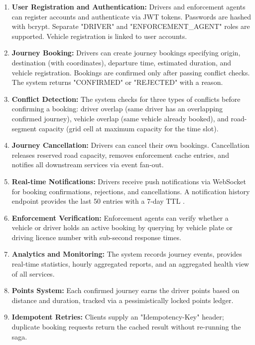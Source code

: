 \documentclass[11pt,a4paper]{article}
\begin{document}
\begin{enumerate}[label=\textbf{FR\arabic*}]
    \item \textbf{User Registration and Authentication:} Drivers and enforcement agents can register accounts and authenticate via JWT tokens. Passwords are hashed with bcrypt. Separate "DRIVER" and "ENFORCEMENT\_AGENT" roles are supported. Vehicle registration is linked to user accounts.
    \item \textbf{Journey Booking:} Drivers can create journey bookings specifying origin, destination (with coordinates), departure time, estimated duration, and vehicle registration. Bookings are confirmed only after passing conflict checks. The system returns "CONFIRMED" or "REJECTED" with a reason.
    \item \textbf{Conflict Detection:} The system checks for three types of conflicts before confirming a booking: driver overlap (same driver has an overlapping confirmed journey), vehicle overlap (same vehicle already booked), and road-segment capacity (grid cell at maximum capacity for the time slot).
    \item \textbf{Journey Cancellation:} Drivers can cancel their own bookings. Cancellation releases reserved road capacity, removes enforcement cache entries, and notifies all downstream services via event fan-out.
    \item \textbf{Real-time Notifications:} Drivers receive push notifications via WebSocket for booking confirmations, rejections, and cancellations. A notification history endpoint provides the last 50 entries with a 7-day TTL .
    \item \textbf{Enforcement Verification:} Enforcement agents can verify whether a vehicle or driver holds an active booking by querying by vehicle plate or driving licence number with sub-second response times.
    \item \textbf{Analytics and Monitoring:} The system records journey events, provides real-time statistics, hourly aggregated reports, and an aggregated health view of all services.
    \item \textbf{Points System:} Each confirmed journey earns the driver points based on distance and duration, tracked via a pessimistically locked points ledger.
    \item \textbf{Idempotent Retries:} Clients supply an "Idempotency-Key" header; duplicate booking requests return the cached result without re-running the saga.
\end{enumerate}
 
\end{document}
